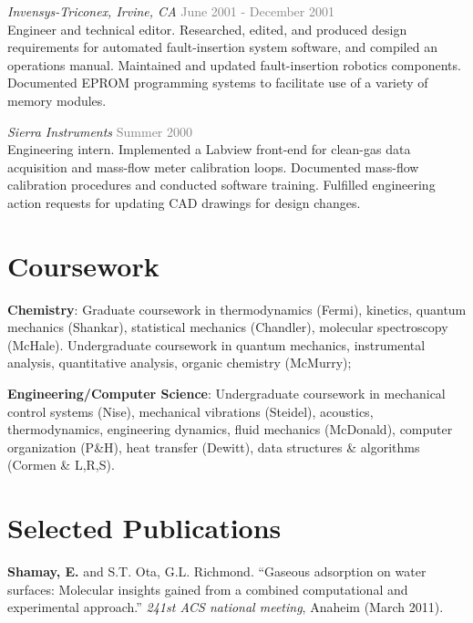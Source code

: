 \documentclass[margin,line]{res}
\begin{document}
\begin{resume}
\emph{Invensys-Triconex, Irvine, CA} \hfill {\textcolor{gray}{June 2001 - December 2001}} \\
Engineer and technical editor. Researched, edited, and produced design requirements for automated fault-insertion system software, and compiled an operations manual. Maintained and updated fault-insertion robotics components. Documented EPROM programming systems to facilitate use of a variety of memory modules. 


\emph{Sierra Instruments} \hfill {\textcolor{gray}{Summer 2000}} \\
Engineering intern. Implemented a Labview front-end for clean-gas data acquisition and mass-flow meter calibration loops. Documented mass-flow calibration procedures and conducted software training. Fulfilled engineering action requests for updating CAD drawings for design changes.


\section{\sc Coursework}

\textbf{Chemistry}: Graduate coursework in thermodynamics (Fermi), kinetics, quantum mechanics (Shankar), statistical mechanics (Chandler), molecular spectroscopy (McHale). Undergraduate coursework in quantum mechanics, instrumental analysis, quantitative analysis, organic chemistry (McMurry); 
\vspace*{-.1in}

\textbf{Engineering/Computer Science}: Undergraduate coursework in mechanical control systems (Nise), mechanical vibrations (Steidel), acoustics, thermodynamics, engineering dynamics, fluid mechanics (McDonald), computer organization (P\&H), heat transfer (Dewitt), data structures \& algorithms (Cormen \& L,R,S). 

\section{\sc Selected Publications}


\textbf{Shamay, E.} and S.T. Ota, G.L. Richmond. ``Gaseous adsorption on water surfaces: Molecular insights gained from a combined computational and experimental approach.'' \emph{241st ACS national meeting}, Anaheim (March 2011).


\end{resume}
\end{document}
